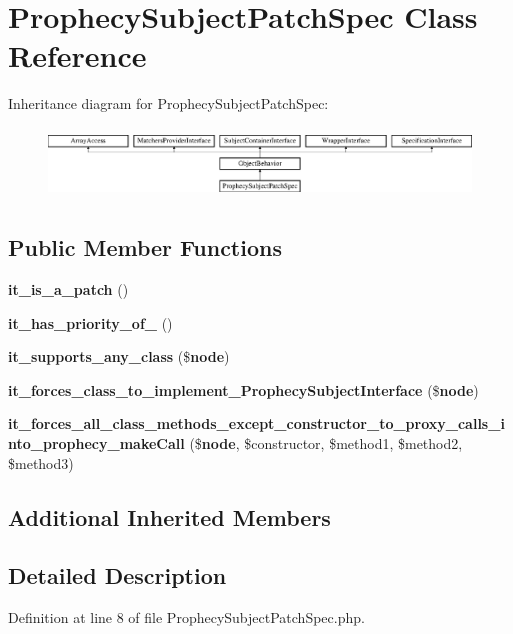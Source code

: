 \section{Prophecy\+Subject\+Patch\+Spec Class Reference}
\label{classspec_1_1_prophecy_1_1_doubler_1_1_class_patch_1_1_prophecy_subject_patch_spec}
Inheritance diagram for Prophecy\+Subject\+Patch\+Spec\+:\begin{figure}[H]
\begin{center}
\leavevmode
\includegraphics[height=1.887640cm]{classspec_1_1_prophecy_1_1_doubler_1_1_class_patch_1_1_prophecy_subject_patch_spec}
\end{center}
\end{figure}
\subsection*{Public Member Functions}
\begin{DoxyCompactItemize}
\item 
{\bf it\+\_\+is\+\_\+a\+\_\+patch} ()
\item 
{\bf it\+\_\+has\+\_\+priority\+\_\+of\+\_} ()
\item 
{\bf it\+\_\+supports\+\_\+any\+\_\+class} (\${\bf node})
\item 
{\bf it\+\_\+forces\+\_\+class\+\_\+to\+\_\+implement\+\_\+\+Prophecy\+Subject\+Interface} (\${\bf node})
\item 
{\bf it\+\_\+forces\+\_\+all\+\_\+class\+\_\+methods\+\_\+except\+\_\+constructor\+\_\+to\+\_\+proxy\+\_\+calls\+\_\+into\+\_\+prophecy\+\_\+make\+Call} (\${\bf node}, \$constructor, \$method1, \$method2, \$method3)
\end{DoxyCompactItemize}
\subsection*{Additional Inherited Members}


\subsection{Detailed Description}


Definition at line 8 of file Prophecy\+Subject\+Patch\+Spec.\+php.



